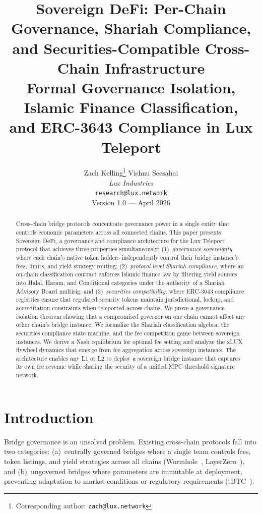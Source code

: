 \documentclass[11pt,twocolumn]{article}
\title{
  \textbf{Sovereign DeFi: Per-Chain Governance, Shariah Compliance,\\
  and Securities-Compatible Cross-Chain Infrastructure} \\[6pt]
  \large Formal Governance Isolation, Islamic Finance Classification,\\
  and ERC-3643 Compliance in Lux Teleport
}
\author{
  Zach Kelling\thanks{Corresponding author: \texttt{zach@lux.network}} \quad
  Vishnu Seesahai \\
  \textit{Lux Industries} \\
  \texttt{research@lux.network} \\[4pt]
  \small Version 1.0 --- April 2026
}
\date{}
\theoremstyle{definition}
\begin{document}
\maketitle

\begin{abstract}
Cross-chain bridge protocols concentrate governance power in a single entity that controls economic parameters across all connected chains. This paper presents Sovereign DeFi, a governance and compliance architecture for the Lux Teleport protocol that achieves three properties simultaneously: (1)~\emph{governance sovereignty}, where each chain's native token holders independently control their bridge instance's fees, limits, and yield strategy routing; (2)~\emph{protocol-level Shariah compliance}, where an on-chain classification contract enforces Islamic finance law by filtering yield sources into Halal, Haram, and Conditional categories under the authority of a Shariah Advisory Board multisig; and (3)~\emph{securities compatibility}, where ERC-3643 compliance registries ensure that regulated security tokens maintain jurisdictional, lockup, and accreditation constraints when teleported across chains. We prove a governance isolation theorem showing that a compromised governor on one chain cannot affect any other chain's bridge instance. We formalize the Shariah classification algebra, the securities compliance state machine, and the fee competition game between sovereign instances. We derive a Nash equilibrium for optimal fee setting and analyze the xLUX flywheel dynamics that emerge from fee aggregation across sovereign instances. The architecture enables any L1 or L2 to deploy a sovereign bridge instance that captures its own fee revenue while sharing the security of a unified MPC threshold signature network.
\end{abstract}

\section{Introduction}
\label{sec:intro}

Bridge governance is an unsolved problem. Existing cross-chain protocols fall into two categories: (a)~centrally governed bridges where a single team controls fees, token listings, and yield strategies across all chains (Wormhole~\cite{wormhole}, LayerZero~\cite{layerzero}), and (b)~ungoverned bridges where parameters are immutable at deployment, preventing adaptation to market conditions or regulatory requirements (tBTC~\cite{tbtc}).
\end{document}
